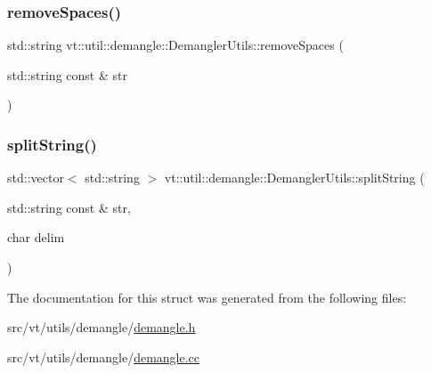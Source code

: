 \mbox{\label{structvt_1_1util_1_1demangle_1_1_demangler_utils_a2e57c8080f9296b2ce137c622718d7bb}} 
\subsubsection{\texorpdfstring{remove\+Spaces()}{removeSpaces()}}
{\footnotesize\ttfamily std\+::string vt\+::util\+::demangle\+::\+Demangler\+Utils\+::remove\+Spaces (\begin{DoxyParamCaption}\item[{std\+::string const \&}]{str }\end{DoxyParamCaption})\hspace{0.3cm}{\ttfamily [static]}}

\mbox{\label{structvt_1_1util_1_1demangle_1_1_demangler_utils_a3c280c288503a3420483e6705cddf5fb}} 
\subsubsection{\texorpdfstring{split\+String()}{splitString()}}
{\footnotesize\ttfamily std\+::vector$<$ std\+::string $>$ vt\+::util\+::demangle\+::\+Demangler\+Utils\+::split\+String (\begin{DoxyParamCaption}\item[{std\+::string const \&}]{str,  }\item[{char}]{delim }\end{DoxyParamCaption})\hspace{0.3cm}{\ttfamily [static]}}



The documentation for this struct was generated from the following files\+:\begin{DoxyCompactItemize}
\item 
src/vt/utils/demangle/\hyperlink{demangle_8h}{demangle.\+h}\item 
src/vt/utils/demangle/\hyperlink{demangle_8cc}{demangle.\+cc}\end{DoxyCompactItemize}
